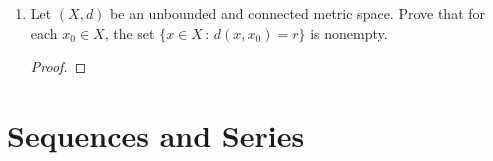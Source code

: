 \documentclass[reqno]{article}
\theoremstyle{remark}
\numberwithin{equation}{section}
\begin{document}
\begin{enumerate}
\begin{proof}
Thus, $f_{n_j}$ also converges to $k_0$, and since $F$ is closed, $k_0 \in F$. So $K \cap F \neq \emptyset$.
\end{proof} 
	
\item Let $(X,d)$ be an unbounded and connected metric space. Prove that for each $x_0 \in X$, the set $\{x \in X \, \colon \,  d(x,x_0) = r\}$ is nonempty. 

\begin{proof} 

\end{proof} 




\end{enumerate} 
\section{Sequences and Series}
\end{document}
